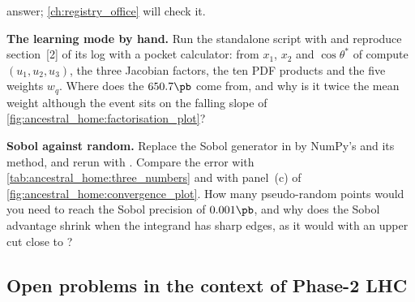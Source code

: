 \begin{exercises}
  answer; \cref{ch:registry_office} will check it.
\item \textbf{The learning mode by hand.} Run the standalone script with
   and reproduce section~[2] of its log with a pocket calculator:
  from $x_1$, $x_2$ and $\cos\theta^*$ of  compute
  $(u_1,u_2,u_3)$, the three Jacobian factors, the ten PDF products and the
  five weights $w_q$. Where does the $650.7\pb$ come from, and why is it
  twice the mean weight although the event sits on the falling slope of
  \cref{fig:ancestral_home:factorisation_plot}?
\item \textbf{Sobol against random.} Replace the Sobol generator in
   by NumPy's  and its
   method, and rerun with . Compare the error with
  \cref{tab:ancestral_home:three_numbers} and with panel~(c) of
  \cref{fig:ancestral_home:convergence_plot}. How many pseudo-random points
  would you need to reach the Sobol precision of $0.001\pb$, and why does the
  Sobol advantage shrink when the integrand has sharp edges, as it would with
  an upper cut  close to ?
\end{exercises}

\subsection*{Open problems in the context of Phase-2 LHC}
\label{sec:ancestral_home:open_problems}

